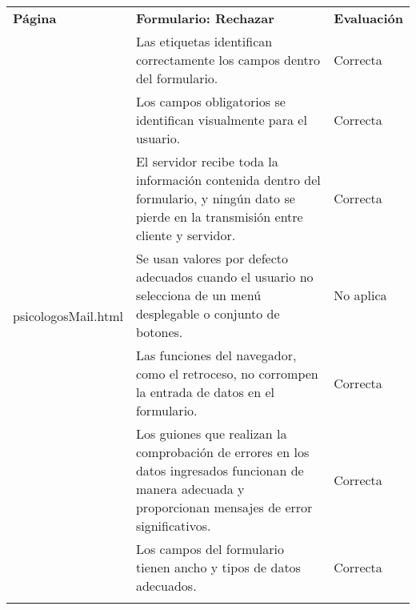 \begin{table}[htpb]
\centering
\begin{tabularx}{\textwidth}{|l|X|l|}
\hline
\rowcolor[gray]{0.9}\multicolumn{3}{|l|}{\textbf{Anexo PI-010}}                                                                                                                                                                              \\ \hline
\textbf{Página}                       & \textbf{Formulario: Rechazar}                                                                                                                             & \textbf{Evaluación} \\ \hline
\multirow{10}{*}{psicologosMail.html} & Las etiquetas identifican correctamente los campos dentro del formulario.                                                                                 & Correcta            \\ \cline{2-3} 
                                      & Los campos obligatorios se identifican visualmente para el usuario.                                                                                       & Correcta            \\ \cline{2-3} 
                                      & El servidor recibe toda la información contenida dentro del formulario, y ningún dato se pierde en la transmisión entre cliente y servidor.               & Correcta            \\ \cline{2-3} 
                                      & Se usan valores por defecto adecuados cuando el usuario no selecciona de un menú desplegable o conjunto de botones.                                       & No aplica           \\ \cline{2-3} 
                                      & Las funciones del navegador, como el retroceso, no corrompen la entrada de datos en el formulario.                                                        & Correcta            \\ \cline{2-3} 
                                      & Los guiones que realizan la comprobación de errores en los datos ingresados funcionan de manera adecuada y proporcionan mensajes de error significativos. & Correcta            \\ \cline{2-3} 
                                      & Los campos del formulario tienen ancho y tipos de datos adecuados.                                                                                        & Correcta            \\ \cline{2-3} 

\end{tabularx}
\end{table}
